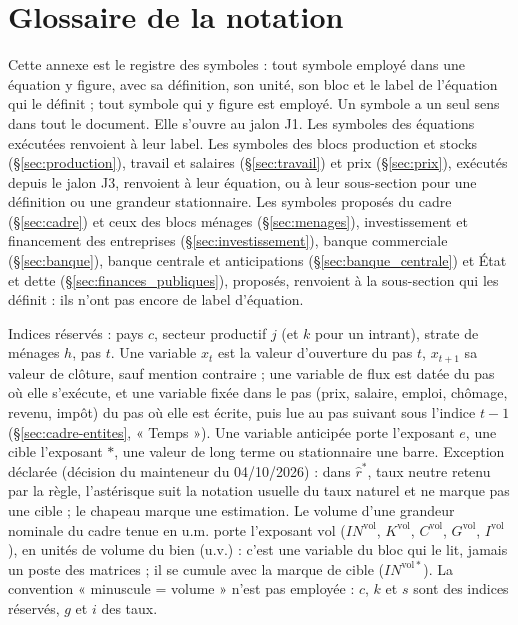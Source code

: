 \documentclass[11pt,a4paper]{article}
\begin{document}
\section{Glossaire de la notation}
\label{sec:glossaire}
Cette annexe est le registre des symboles : tout symbole employé dans une équation y figure, avec sa définition, son unité, son bloc et le label de l'équation qui le définit ; tout symbole qui y figure est employé. Un symbole a un seul sens dans tout le document. Elle s'ouvre au jalon J1. Les symboles des équations exécutées renvoient à leur label. Les symboles des blocs production et stocks (\S\ref{sec:production}), travail et salaires (\S\ref{sec:travail}) et prix (\S\ref{sec:prix}), exécutés depuis le jalon J3, renvoient à leur équation, ou à leur sous-section pour une définition ou une grandeur stationnaire. Les symboles proposés du cadre (\S\ref{sec:cadre}) et ceux des blocs ménages (\S\ref{sec:menages}), investissement et financement des entreprises (\S\ref{sec:investissement}), banque commerciale (\S\ref{sec:banque}), banque centrale et anticipations (\S\ref{sec:banque_centrale}) et État et dette (\S\ref{sec:finances_publiques}), proposés, renvoient à la sous-section qui les définit : ils n'ont pas encore de label d'équation.

Indices réservés : pays $c$, secteur productif $j$ (et $k$ pour un intrant), strate de ménages $h$, pas $t$. Une variable $x_t$ est la valeur d'ouverture du pas $t$, $x_{t+1}$ sa valeur de clôture, sauf mention contraire ; une variable de flux est datée du pas où elle s'exécute, et une variable fixée dans le pas (prix, salaire, emploi, chômage, revenu, impôt) du pas où elle est écrite, puis lue au pas suivant sous l'indice $t - 1$ (\S\ref{sec:cadre-entites}, « Temps »). Une variable anticipée porte l'exposant $e$, une cible l'exposant $\ast$, une valeur de long terme ou stationnaire une barre. Exception déclarée (décision du mainteneur du 04/10/2026) : dans $\hat r^\ast$, taux neutre retenu par la règle, l'astérisque suit la notation usuelle du taux naturel et ne marque pas une cible ; le chapeau marque une estimation. Le volume d'une grandeur nominale du cadre tenue en u.m. porte l'exposant $\mathrm{vol}$ ($\mathit{IN}^{\mathrm{vol}}$, $K^{\mathrm{vol}}$, $C^{\mathrm{vol}}$, $G^{\mathrm{vol}}$, $I^{\mathrm{vol}}$), en unités de volume du bien (u.v.) : c'est une variable du bloc qui le lit, jamais un poste des matrices ; il se cumule avec la marque de cible ($\mathit{IN}^{\mathrm{vol}\ast}$). La convention « minuscule = volume » n'est pas employée : $c$, $k$ et $s$ sont des indices réservés, $g$ et $i$ des taux.
\end{document}
